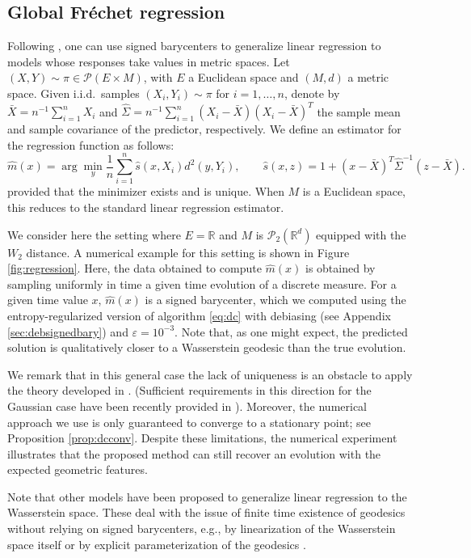 \documentclass[12pt]{amsart}
\numberwithin{equation}{section}
\let\mc=\mathcal
\theoremstyle{plain}
\theoremstyle{definition}
\begin{document}
\subsection{Global Fréchet regression} Following \cite{petersen2019frechet}, one can use signed barycenters to generalize linear regression to models whose responses take values in metric spaces.  Let $(X,Y)\sim \pi \in \mc{P}(E \times M)$, with $E$ a Euclidean space and $(M,d)$ a metric space. Given i.i.d.\ samples $(X_i,Y_i) \sim \pi$ for $i=1,\ldots,n$,  denote by  $\bar{X} = n^{-1} \sum_{i=1}^n X_i$ and $\hat{\Sigma} = n^{-1}\sum_{i=1}^n(X_i-\bar{X})(X_i -\bar{X})^T$ the sample mean and sample covariance of the predictor, respectively. We define an estimator for the regression function as follows:
\[
\hat{m}(x)=\operatorname{arg}\min_y\frac1n\sum_{i=1}^n\hat{s}(x,X_i)d^2(y,Y_i),
\qquad
\hat{s}(x,z)=1+(x-\bar{X})^T\hat{\Sigma}^{-1}(z-\bar{X}).
\]
provided that the minimizer exists and is unique. When $M$ is a Euclidean space, this reduces to the standard linear regression estimator.  

We consider here the setting where $E=\mathbb{R}$ and $M$ is $\mc{P}_2(\mathbb{R}^d)$ equipped with the $W_2$ distance. A numerical example for this setting is shown in Figure \ref{fig:regression}. Here, the data obtained to compute $\hat{m}(x)$ is obtained by sampling uniformly in time a given time evolution of a discrete measure.  For a given time value $x$, $\hat{m}(x)$ is a signed barycenter, which we computed using the entropy-regularized version of algorithm   \eqref{eq:dc} with debiasing (see Appendix \ref{sec:debsignedbary}) and $\varepsilon = 10^{-3}$. Note that, as one might expect, the predicted solution is qualitatively closer to a Wasserstein geodesic than the true evolution.

We remark that in this general case the lack of uniqueness is an obstacle to apply the theory developed in \cite{petersen2019frechet}. (Sufficient requirements in this direction for the Gaussian case have been recently provided in \cite{nguyen2026fr}). Moreover, the numerical approach we use is only guaranteed to converge to a stationary point; see Proposition \ref{prop:dcconv}. Despite these limitations, the numerical experiment illustrates that the proposed method can still recover an evolution with the expected geometric features. 

Note that other models have been proposed to generalize linear regression to the Wasserstein space. These deal with the issue of finite time existence of geodesics without relying on signed barycenters, e.g., by linearization of the Wasserstein space itself \cite{wang2013linear,seguy2015principal} or by explicit parameterization of the geodesics \cite{vesseron2026wasserstein}. 
\end{document}
